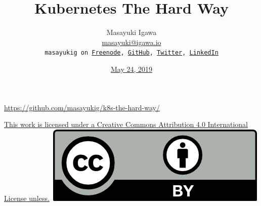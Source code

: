 \documentclass[aspectratio=169,11pt,hyperref={colorlinks=true}]{beamer}
\author[Masayuki Igawa]{%
    \texorpdfstring{%
            \centering
            Masayuki Igawa\\
            \href{mailto:masayuki@igawa.io}{masayuki@igawa.io}\\
            \texttt{masayukig on
              \href{https://freenode.net/}{Freenode},
              \href{https://github.com/masayukig}{GitHub},
              \href{https://twitter.com/masayukig}{Twitter},
              \href{https://www.linkedin.com/in/masayukig/}{LinkedIn}}
    }
    {Masayuki Igawa}
}
\date{\href{https://events.opensuse.org/conferences/oSC19}{May 24, 2019}}
\title[k8s-the-hard-way
  \hspace{4em}\insertframenumber/\inserttotalframenumber]{\Huge{Kubernetes The Hard Way}}
\begin{document}
{%
\begin{frame}[noframenumbering]
  \hypersetup{colorlinks,urlcolor=susedark}
  \titlepage{}
  \centering
  \@place \par
  \href{https://github.com/masayukig/k8s-the-hard-way/}{https://github.com/masayukig/k8s-the-hard-way/}
  \begin{flushright}
    \tiny\href{https://creativecommons.org/licenses/by/4.0/}{This work
      is licensed under a Creative Commons Attribution 4.0
      International License unless.}~\includegraphics[scale=0.3]{images/cc_by.png}
  \end{flushright}
\end{frame}
}
\end{document}

